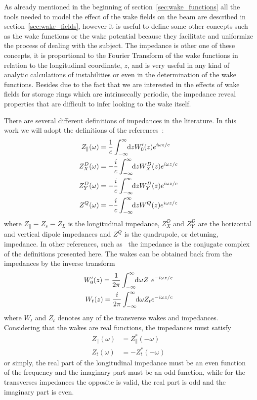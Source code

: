     As already mentioned in the beginning of section~\ref{sec:wake_functions} all the tools needed to model the effect of the wake fields on the beam are described in section~\ref{sec:wake_fields}, however it is useful to define some other concepts such as the wake functions or the wake potential because they facilitate and uniformize the process of dealing with the subject. The impedance is other one of these concepts, it is proportional to the Fourier Transform of the wake functions in relation to the longitudinal coordinate, $z$, and is very useful in any kind of analytic calculations of instabilities or even in the determination of the wake functions. Besides due to the fact that we are interested in the effects of wake fields for storage rings which are intrinsecally periodic, the impedance reveal properties that are difficult to infer looking to the wake itself.

    There are several different definitions of impedances in the literature. In this work we will adopt the definitions of the references~\cite{CHao1993, Stupakov2000a, Heifets1991}:
    \begin{align}\label{eq:impedances_definition}
	  	\nonumber
  	  	Z_\parallel(\omega) &= \frac1c \infint{z}{W'_0(z)e^{i\omega z/c}}\\
  	  	\nonumber
      	Z^D_X(\omega) &= -\frac{i}{c} \infint{z}{W^D_X(z)e^{i\omega z/c}}\\
      	Z^D_Y(\omega) &= -\frac{i}{c} \infint{z}{W^D_Y(z)e^{i\omega z/c}}\\
	  	\nonumber
      	Z^Q(\omega) &= -\frac{i}{c} \infint{z}{W^Q(z)e^{i\omega z/c}}
    \end{align}
    where $Z_\parallel \equiv Z_s \equiv Z_L$ is the longitudinal impedance, $Z^D_X$ and $Z^D_Y$ are the horizontal and vertical dipole impedances and $Z^Q$ is the quadrupole, or detuning, impedance. In other references, such as~\cite{Zotter1993, Wilson1987} the impedance is the conjugate complex of the definitions presented here. The wakes can be obtained back from the impedances by the inverse transform
    \begin{align}\label{eq:wake_as_impedance}
	  	\nonumber
  	  	W'_0(z) = \frac{1}{2\pi}\int_{-\infty}^{\infty}\!\!\text{d}\omega Z_\parallel e^{-i\omega z/c}\\
	  	W_t(z) = \frac{i}{2\pi}\int_{-\infty}^{\infty}\!\!\text{d}\omega Z_t e^{-i\omega z/c}
    \end{align}
    where $W_t$ and $Z_t$ denotes any of the transverse wakes and impedances. Considering that the wakes are real functions, the impedances must satisfy
    \begin{align}
  	  	Z_\parallel(\omega) &= Z_\parallel^*(-\omega)\\
	  	Z_t(\omega) &= -Z_t^*(-\omega)
    \end{align}
    or simply, the real part of the longitudinal impedance must be an even function of the frequency and the imaginary part must be an odd function, while for the transverses impedances the opposite is valid, the real part is odd and the imaginary part is even.

